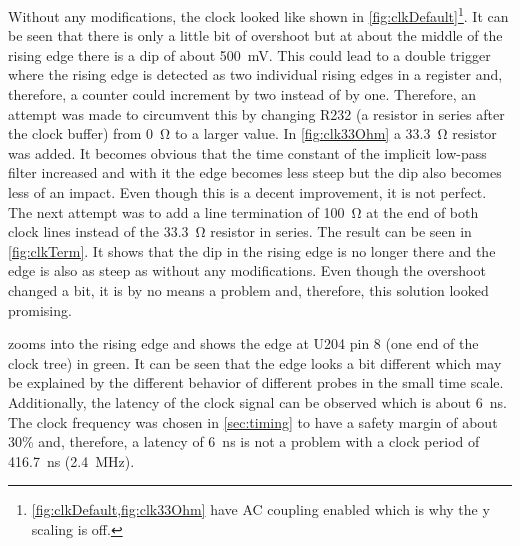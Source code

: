 Without any modifications, the clock looked like shown in \cref{fig:clkDefault}\footnote{\cref{fig:clkDefault,fig:clk33Ohm} have AC coupling enabled which is why the y scaling is off.}.
It can be seen that there is only a little bit of overshoot but at about the middle of the rising edge there is a dip of about \qty{500}{\milli\volt}.
This could lead to a double trigger where the rising edge is detected as two individual rising edges in a register and, therefore, a counter could increment by two instead of by one.
Therefore, an attempt was made to circumvent this by changing R232 (a resistor in series after the clock buffer) from \qty{0}{\ohm} to a larger value.
In \cref{fig:clk33Ohm} a \qty{33.3}{\ohm} resistor was added.
It becomes obvious that the time constant of the implicit low-pass filter increased and with it the edge becomes less steep but the dip also becomes less of an impact.
Even though this is a decent improvement, it is not perfect.
The next attempt was to add a line termination of \qty{100}{\ohm} at the end of both clock lines instead of the \qty{33.3}{\ohm} resistor in series.
The result can be seen in \cref{fig:clkTerm}.
It shows that the dip in the rising edge is no longer there and the edge is also as steep as without any modifications.
Even though the overshoot changed a bit, it is by no means a problem and, therefore, this solution looked promising.

 zooms into the rising edge and shows the edge at U204 pin 8 (one end of the clock tree) in green.
It can be seen that the edge looks a bit different which may be explained by the different behavior of different probes in the small time scale.
Additionally, the latency of the clock signal can be observed which is about \qty{6}{\nano\second}.
The clock frequency was chosen in \cref{sec:timing} to have a safety margin of about 30\% and, therefore, a latency of \qty{6}{\nano\second} is not a problem with a clock period of \qty{416.7}{\nano\second} (\qty{2.4}{\mega\hertz}).

